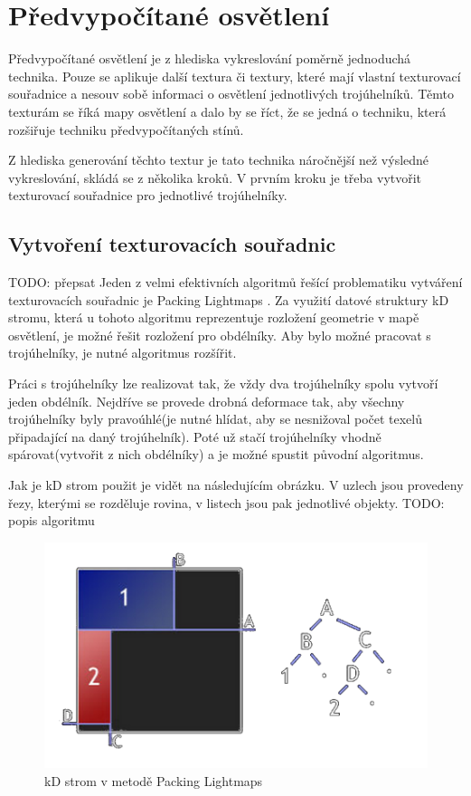 \documentclass[11pt,twoside,a4paper]{book}
\begin{document}
\section{Předvypočítané osvětlení}
Předvypočítané osvětlení je z hlediska vykreslování poměrně jednoduchá technika. Pouze se aplikuje další textura či textury, které mají vlastní texturovací souřadnice a nesou\linebreak v sobě informaci o osvětlení jednotlivých trojúhelníků. Těmto texturám se říká mapy osvětlení a dalo by se říct, že se jedná o techniku, která rozšiřuje techniku předvypočítaných stínů.

Z hlediska generování těchto textur je tato technika náročnější než výsledné vykreslování, skládá se z několika kroků. V prvním kroku je třeba vytvořit texturovací souřadnice pro jednotlivé trojúhelníky.

\subsection{Vytvoření texturovacích souřadnic}
TODO: přepsat
Jeden z velmi efektivních algoritmů řešící problematiku vytváření texturovacích souřadnic je Packing Lightmaps \cite{Scott02}. Za využití datové struktury kD stromu, která u tohoto algoritmu reprezentuje rozložení geometrie v mapě osvětlení, je možné řešit rozložení pro obdélníky. Aby bylo možné pracovat s trojúhelníky, je nutné algoritmus rozšířit.

Práci s trojúhelníky lze realizovat tak, že vždy dva trojúhelníky spolu vytvoří jeden obdélník. Nejdříve se provede drobná deformace tak, aby všechny trojúhelníky byly pravoúhlé(je nutné hlídat, aby se nesnižoval počet texelů připadající na daný trojúhelník). Poté už stačí trojúhelníky vhodně spárovat(vytvořit z nich obdélníky) a je možné spustit původní algoritmus.

Jak je kD strom použit je vidět na následujícím obrázku. V uzlech jsou provedeny řezy, kterými se rozděluje rovina, v listech jsou pak jednotlivé objekty.
TODO: popis algoritmu

\begin{center}
\begin{figure}[h!]
\includegraphics[width=120mm]{figures/packingLM.png}
\caption{kD strom v metodě Packing Lightmaps}
\end{figure}
\end{center}
\newpage
\end{document}
